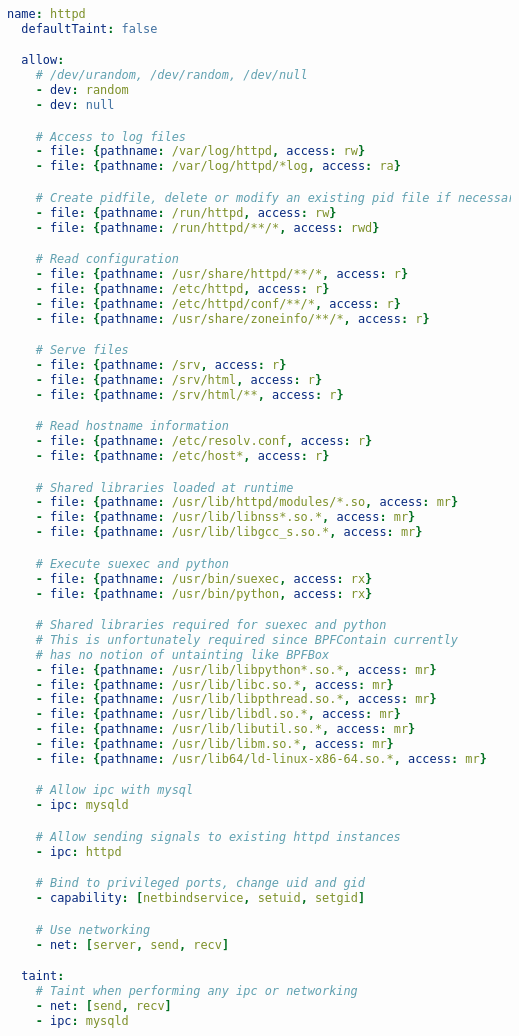 \begin{lstlisting}[language=yaml, gobble=2, float=false, caption={[A \bpfcontain{} policy for Apache httpd]
  A \bpfcontain{} policy for Apache httpd.
  %\todo{Describe this}
}, label={lst:bpfcontain-apache}]
  name: httpd
  defaultTaint: false

  allow:
    # /dev/urandom, /dev/random, /dev/null
    - dev: random
    - dev: null

    # Access to log files
    - file: {pathname: /var/log/httpd, access: rw}
    - file: {pathname: /var/log/httpd/*log, access: ra}

    # Create pidfile, delete or modify an existing pid file if necessary
    - file: {pathname: /run/httpd, access: rw}
    - file: {pathname: /run/httpd/**/*, access: rwd}

    # Read configuration
    - file: {pathname: /usr/share/httpd/**/*, access: r}
    - file: {pathname: /etc/httpd, access: r}
    - file: {pathname: /etc/httpd/conf/**/*, access: r}
    - file: {pathname: /usr/share/zoneinfo/**/*, access: r}

    # Serve files
    - file: {pathname: /srv, access: r}
    - file: {pathname: /srv/html, access: r}
    - file: {pathname: /srv/html/**, access: r}

    # Read hostname information
    - file: {pathname: /etc/resolv.conf, access: r}
    - file: {pathname: /etc/host*, access: r}

    # Shared libraries loaded at runtime
    - file: {pathname: /usr/lib/httpd/modules/*.so, access: mr}
    - file: {pathname: /usr/lib/libnss*.so.*, access: mr}
    - file: {pathname: /usr/lib/libgcc_s.so.*, access: mr}

    # Execute suexec and python
    - file: {pathname: /usr/bin/suexec, access: rx}
    - file: {pathname: /usr/bin/python, access: rx}

    # Shared libraries required for suexec and python
    # This is unfortunately required since BPFContain currently
    # has no notion of untainting like BPFBox
    - file: {pathname: /usr/lib/libpython*.so.*, access: mr}
    - file: {pathname: /usr/lib/libc.so.*, access: mr}
    - file: {pathname: /usr/lib/libpthread.so.*, access: mr}
    - file: {pathname: /usr/lib/libdl.so.*, access: mr}
    - file: {pathname: /usr/lib/libutil.so.*, access: mr}
    - file: {pathname: /usr/lib/libm.so.*, access: mr}
    - file: {pathname: /usr/lib64/ld-linux-x86-64.so.*, access: mr}

    # Allow ipc with mysql
    - ipc: mysqld

    # Allow sending signals to existing httpd instances
    - ipc: httpd

    # Bind to privileged ports, change uid and gid
    - capability: [netbindservice, setuid, setgid]

    # Use networking
    - net: [server, send, recv]

  taint:
    # Taint when performing any ipc or networking
    - net: [send, recv]
    - ipc: mysqld
\end{lstlisting}


